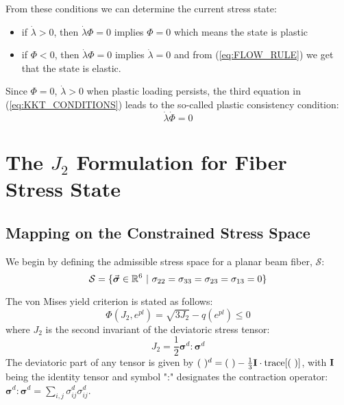 From these conditions we can determine the current stress state:
\begin{itemize}
	\item if $\dot{\lambda}>0$, then $\dot{\lambda}\Phi=0$ implies $\Phi=0$ 
	which 
	means 
	the state is plastic
	\item if $\Phi<0$, then $\dot{\lambda}\Phi=0$ implies $\dot{\lambda}=0$ and 
	from 
	(\ref{eq:FLOW_RULE}) we get that the state is elastic.
\end{itemize}
Since $\Phi=0$, $\dot{\lambda}>0$ when plastic loading persists, the third 
equation
in (\ref{eq:KKT_CONDITIONS}) leads to the so-called plastic consistency
condition:
\begin{equation}
	\dot{\lambda}\dot{\Phi}=0
	\label{eq:PLASTIC_CONSISTENCY_CONDITION}
\end{equation}

\section{The \texorpdfstring{$J_2$}{text} Formulation for Fiber Stress 
State}\label{section:CH3-S3}

\subsection{Mapping on the Constrained Stress Space}\label{section:CH3-S3SS1}

We begin by defining the admissible stress space for a planar beam fiber, 
$\mathcal{S}$:
\begin{equation*}
	\mathcal{S} = \{\vec{\bm{\sigma}}\in\mathbb{R}^6\ |\
	\sigma_{22}=\sigma_{33}=\sigma_{23}=\sigma_{13}=0\}
\end{equation*}

\noindent The von Mises yield criterion is stated as follows:
\begin{equation}
	\Phi(J_2,e^{pl}) = \sqrt{3J_2} - q(e^{pl}) \leq 0
	\label{eq:VON_MISES_FUNC}
\end{equation}
where $J_2$
is the second invariant of the deviatoric stress tensor:
\begin{equation}
	J_2 = \frac{1}{2}\bm{\sigma}^d:\bm{\sigma}^d
	\label{eq:J2}
\end{equation}
The deviatoric part of any tensor is given by $(\ )^d=(\ 
)-\frac{1}{3}\bmat{I}\cdot\text{trace}[(\ )]$, with $\mathbf{I}$ being the 
identity tensor and symbol ":" designates the contraction operator: 
$\bm{\sigma}^d:\bm{\sigma}^d = \sum_{i,j}\sigma_{ij}^d\sigma_{ij}^d$.


